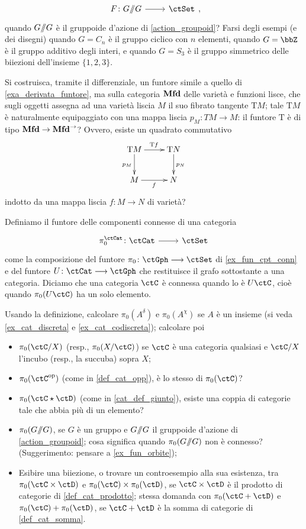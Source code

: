 \begin{esercizi}
 \[\dmFun F {\act G}\ctSet,\]
 quando \(G/\!\!/G\) è il gruppoide d'azione di \ref{action_groupoid}? Farsi degli esempi (e dei disegni) quando \(G=C_n\) è il gruppo ciclico con \(n\) elementi, quando \(G=\bbZ\) è il gruppo additivo degli interi, e quando \(G=S_3\) è il gruppo simmetrico delle biiezioni dell'insieme \(\{1,2,3\}\).
 \item \label{gfdpgubai_4} Si costruisca, tramite il differenziale, un funtore simile a quello di \ref{exa_derivata_funtore}, ma sulla categoria \(\mathbf{Mfd}\) delle varietà e funzioni lisce, che sugli oggetti assegna ad una varietà liscia \(M\) il suo fibrato tangente \(\text{T} M\); tale \(\text{T} M\) è naturalmente equipaggiato con una mappa liscia \(p_M \colon TM\to M\): il funtore \(\text{T}\) è di tipo \(\mathbf{Mfd} \to \mathbf{Mfd}^\to\)? Ovvero, esiste un quadrato commutativo
 \[\xymatrix{
  \text{T} M \ar[r]^{\text{T} f}\ar[d]_{p_M} & \text{T} N \ar[d]^{p_N}\\
  M \ar[r]_f & N
  }\]
 indotto da una mappa liscia \(f \colon M\to N\) di varietà?
 \item \label{exe_cpt_conn} Definiamo il funtore delle componenti connesse di una categoria
 \[\dmFun{\pi_0^\ctCat}{\ctCat}{\ctSet}\]
 come la composizione del funtore \(\pi_0 \colon \ctGph \fun\ctSet\) di \ref{ex_fun_cpt_conn} e del funtore \(U \colon \ctCat \fun\ctGph\) che restituisce il grafo sottostante a una categoria. Diciamo che una categoria \(\ctC\) è connessa quando lo è \(U\ctC\), cioè quando \(\pi_0(U\ctC)\) ha un solo elemento.

 Usando la definizione, calcolare \(\pi_0(A^\delta)\) e \(\pi_0(A^\chi)\) se \(A\) è un insieme (si veda \ref{ex_cat_discreta} e \ref{ex_cat_codiscreta}); calcolare poi
 \begin{itemize}
  \item \(\pi_0(\ctC/X)\) (resp., \(\pi_0(X/\ctC)\)) se \(\ctC\) è una categoria qualsiasi e \(\ctC/X\) l'incubo (resp., la succuba) sopra \(X\);
  \item \(\pi_0(\ctC^\op)\) (come in \ref{def_cat_opp}), è lo stesso di \(\pi_0(\ctC)\)?
  \item \(\pi_0(\ctC\star\ctD)\) (come in \ref{cat_def_giunto}), esiste una coppia di categorie tale che abbia più di un elemento?
  \item \(\pi_0(G/\!\!/G)\), se \(G\) è un gruppo e \(G/\!\!/G\) il gruppoide d'azione di \ref{action_groupoid}; cosa significa quando \(\pi_0(G/\!\!/G)\) non è connesso? (Suggerimento: pensare a \ref{ex_fun_orbite});
  \item Esibire una biiezione, o trovare un controesempio alla sua esistenza, tra \(\pi_0(\ctC\times\ctD)\) e \(\pi_0(\ctC)\times\pi_0(\ctD)\), se \(\ctC\times\ctD\) è il prodotto di categorie di \ref{def_cat_prodotto}; stessa domanda con \(\pi_0(\ctC+\ctD)\) e \(\pi_0(\ctC)+\pi_0(\ctD)\), se \(\ctC+\ctD\) è la somma di categorie di \ref{def_cat_somma}.
 \end{itemize}
\end{esercizi}
